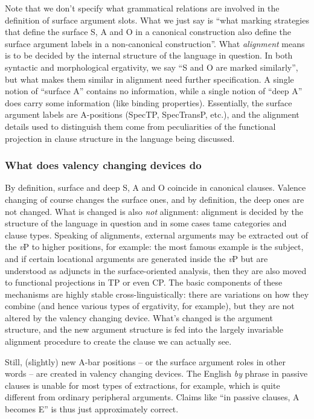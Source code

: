 \documentclass[UTF8, a4paper, oneside, scheme=plain]{ctexart}
\newcommand*{\term}[1]{\emph{#1}}
\newcommand*{\corpus}[1]{\emph{#1}}
\newcommand*{\vP}{\textit{v}P}
\begin{document}
Note that we don't specify what grammatical relations are involved 
in the definition of surface argument slots. 
What we just say is ``what marking strategies that define the surface S, A and O 
in a canonical construction also define the surface argument labels in a non-canonical construction''. 
What \term{alignment} means is to be decided by the internal structure of the language in question.
In both syntactic and morphological ergativity,
we say ``S and O are marked similarly'',
but what makes them similar in alignment need further specification.
A single notion of ``surface A'' contains no information,
while a single notion of ``deep A'' does carry some information
(like binding properties).
Essentially, the surface argument labels are A-positions 
(SpecTP, SpecTransP, etc.),
and the alignment details used to distinguish them come from 
peculiarities of the functional projection in clause structure in the language being discussed.

\subsubsection{What does valency changing devices do}

By definition, surface and deep S, A and O coincide in canonical clauses. 
Valence changing of course changes the surface ones,
and by definition, the deep ones are not changed. 
What is changed is also \emph{not} alignment:
alignment is decided by the structure of the language in question
and in some cases \ac{tame} categories and clause types.
Speaking of alignments, external arguments may be extracted out of the \vP{} to higher positions,
for example:
the most famous example is the subject,
and if certain locational arguments are generated inside the \vP{}
but are understood as adjuncts in the surface-oriented analysis,
then they are also moved to functional projections in TP or even CP.
The basic components of these mechanisms are highly stable cross-linguistically:
there are variations on how they combine 
(and hence various types of ergativity, for example),
but they are not altered by the valency changing device.
What's changed is the argument structure,
and the new argument structure is fed into the largely invariable alignment procedure 
to create the clause we can actually see.

Still, (slightly) new A-bar positions -- or the surface argument roles in other words -- are created
in valency changing devices. 
The English \corpus{by} phrase in passive clauses
is unable for most types of extractions, for example,
which is quite different from ordinary peripheral arguments.
Claims like ``in passive clauses, A becomes E'' is thus just approximately correct.
\end{document}
